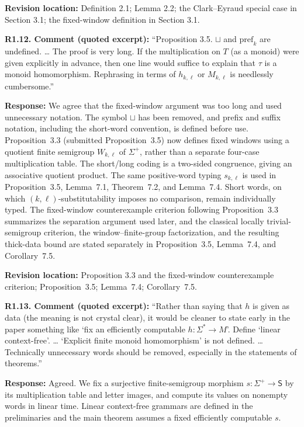 \documentclass[
  10pt,
  a4paper,
]{article}
\begin{document}
\textbf{Revision location:} Definition 2.1; Lemma 2.2; the Clark--Eyraud special case in Section 3.1; the fixed-window definition in Section 3.1.


\textbf{R1.12. Comment (quoted excerpt):} ``Proposition 3.5. \(\sqcup\) and
\(\mathrm{pref}_k\) are undefined. \ldots{} The proof is very long. If
the multiplication on \(T\) (as a monoid) were given explicitly in
advance, then one line would suffice to explain that \(\tau\) is a
monoid homomorphism. Rephrasing in terms of \(h_{k,\ell}\) or
\(M_{k,\ell}\) is needlessly cumbersome.''

\textbf{Response:} We agree that the fixed-window argument was too
long and used unnecessary notation.  The symbol $\sqcup$ has been removed,
and prefix and suffix notation, including the short-word convention, is
defined before use.  Proposition~3.3 (submitted Proposition~3.5) now defines fixed windows using a quotient finite semigroup $W_{k,\ell}$ of $\Sigma^+$, rather than a separate four-case multiplication table. The short/long coding is a two-sided congruence, giving an associative quotient product. The same positive-word typing $s_{k,\ell}$ is used in Proposition~3.5, Lemma~7.1, Theorem~7.2, and Lemma~7.4. Short words, on which
$(k,\ell)$-substitutability imposes no comparison, remain individually
typed. The fixed-window counterexample criterion following
Proposition~3.3 summarizes the separation argument used later, and the
classical locally trivial-semigroup criterion, the window--finite-group
factorization, and the resulting thick-data bound are stated separately
in Proposition~3.5, Lemma~7.4, and Corollary~7.5.

\textbf{Revision location:} Proposition 3.3 and the fixed-window counterexample criterion; Proposition~3.5; Lemma~7.4; Corollary~7.5.


\textbf{R1.13. Comment (quoted excerpt):} ``Rather than saying that \(h\) is
given as data (the meaning is not crystal clear), it would be cleaner to
state early in the paper something like `fix an efficiently computable
\(h:\Sigma^*\to M\)'. Define `linear context-free'.
\ldots{} `Explicit finite monoid homomorphism' is not defined. \ldots{}
Technically unnecessary words should be removed, especially in the
statements of theorems.''

\textbf{Response:} Agreed. We fix a surjective finite-semigroup morphism $s:\Sigma^+\to\mathsf S$ by its multiplication table and letter images, and compute its values on nonempty words in linear time. Linear context-free grammars are defined in the preliminaries and the main theorem assumes a fixed efficiently computable $s$.
\end{document}
